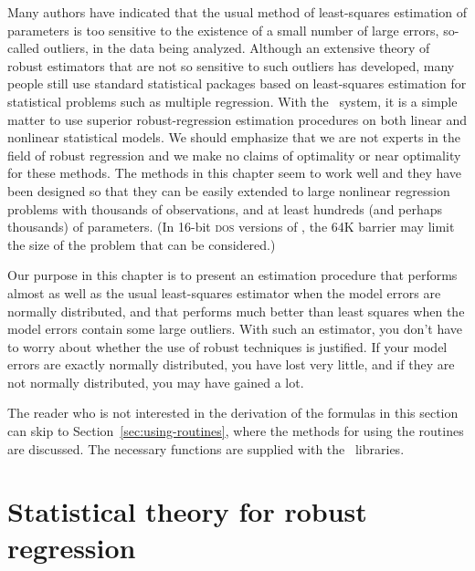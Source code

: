\documentclass{admbmanual}
\begin{document}
Many authors have indicated that the usual method of least-squares estimation of
parameters is too sensitive to the existence of a small number of large errors,
so-called outliers, in the data being analyzed. Although an extensive theory of
robust estimators that are not so sensitive to such outliers has developed, many
people still use standard statistical packages based on least-squares estimation
for statistical problems such as multiple regression. With the \scAD\ system, it
is a simple matter to use superior robust-regression estimation procedures on
both linear and nonlinear statistical models. We should emphasize that we are
not experts in the field of robust regression and we make no claims of
optimality or near optimality for these methods. The methods in this chapter
seem to work well and they have been designed so that they can be easily
extended to large nonlinear regression problems with thousands of observations,
and at least hundreds (and perhaps thousands) of parameters. (In 16-bit
\textsc{dos} versions of \scAD, the 64K barrier may limit the size of the
problem that can be considered.)

Our purpose in this chapter is to present an estimation procedure that performs
almost as well as the usual least-squares estimator when the model errors are
normally distributed, and that performs much better than least squares when the
model errors contain some large outliers. With such an estimator, you don't have
to worry about whether the use of robust techniques is justified. If your model
errors are exactly normally distributed, you have lost very little, and if they
are not normally distributed, you may have gained a lot.

The reader who is not interested in the derivation of the formulas in this
section can skip to
Section~\ref{sec:using-routines}, %
where the methods for using the routines are discussed. The necessary functions
are supplied with the \scAD\ libraries.

\section{Statistical theory for robust regression}
\end{document}
